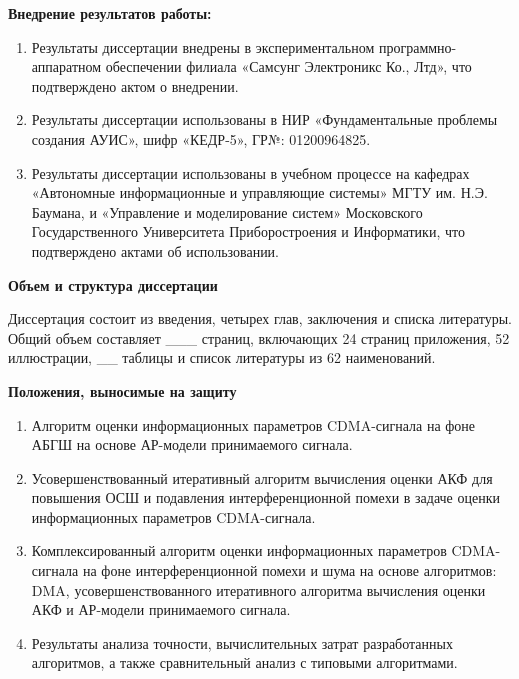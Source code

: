 {\bf{Внедрение результатов работы:}}
\begin{enumerate}
	\item {Результаты диссертации внедрены в экспериментальном программно-аппаратном обеспечении филиала «Самсунг Электроникс Ко., Лтд», что подтверждено актом о внедрении.}
	\item {Результаты диссертации использованы в НИР «Фундаментальные проблемы создания АУИС», шифр «КЕДР-5», ГР№: 01200964825.}
	\item {Результаты диссертации использованы в учебном процессе на кафедрах «Автономные информационные и управляющие системы» МГТУ им. Н.Э. Баумана, и
		«Управление и моделирование систем» Московского Государственного Университета Приборостроения и Информатики, что подтверждено актами об использовании.}
\end{enumerate}

{\bf{Объем и структура диссертации}}

Диссертация состоит из введения, четырех глав, заключения и списка литературы. Общий объем составляет \_\_\_ страниц, включающих 24 страниц приложения, 52 иллюстрации,
\_\_ таблицы и список литературы из 62 наименований.

{\bf{Положения, выносимые на защиту}}
\begin{enumerate}
	\item {Алгоритм оценки информационных параметров CDMA-сигнала на фоне АБГШ на основе АР-модели принимаемого сигнала.}
	\item {Усовершенствованный итеративный алгоритм вычисления оценки АКФ для повышения ОСШ и подавления интерференционной помехи в задаче оценки информационных параметров CDMA-сигнала.}
	\item {Комплексированный алгоритм оценки информационных параметров CDMA-сигнала на фоне интерференционной помехи и шума на основе алгоритмов: DMA, усовершенствованного итеративного алгоритма вычисления оценки АКФ и АР-модели принимаемого сигнала.}
	\item {Результаты анализа точности, вычислительных затрат разработанных алгоритмов, а также сравнительный анализ с типовыми алгоритмами.}
\end{enumerate}

\clearpage
